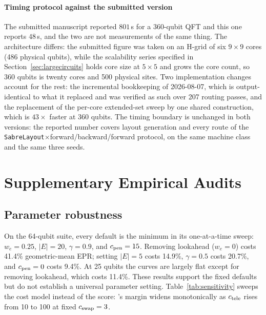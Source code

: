 \paragraph*{Timing protocol against the submitted version}
The submitted manuscript reported $801$\,s for a 360-qubit QFT and this one
reports $48$\,s, and the two are not measurements of the same thing.  The
architecture differs: the submitted figure was taken on an H-grid of six
$9{\times}9$ cores (486 physical qubits), while the scalability series
specified in Section~\ref{sec:largecircuits} holds core size at $5{\times}5$
and grows the core count, so 360 qubits is twenty cores and 500 physical
sites.  Two implementation changes account for the rest: the incremental
bookkeeping of 2026-08-07, which is output-identical to what it replaced and
was verified as such over 207 routing passes, and the replacement of the
per-core extended-set sweep by one shared construction, which is $43\times$
faster at 360 qubits.  The timing boundary is unchanged in both versions: the
reported number covers layout generation and every route of the
\texttt{SabreLayout}$\times$forward/backward/forward protocol, on the same
machine class and the same three seeds.

\section{Supplementary Empirical Audits}
\label{app:audits}

\subsection{Parameter robustness}
\label{app:sensitivity}
On the 64-qubit suite, every default is the minimum in its one-at-a-time
sweep: $w_e=0.25$, $|E|=20$, $\gamma=0.9$, and $c_{\rm pen}=15$.  Removing
lookahead ($w_e=0$) costs 41.4\% geometric-mean EPR; setting $|E|=5$ costs
14.9\%, $\gamma=0.5$ costs 20.7\%, and $c_{\rm pen}=0$ costs 9.4\%.
At 25 qubits the curves are largely flat except for removing lookahead, which
costs 11.4\%.  These results support the fixed defaults but do not establish
a universal parameter setting.  Table~\ref{tab:sensitivity} sweeps the cost
model instead of the score: \dSABRE{}'s margin widens monotonically as
$c_{\rm tele}$ rises from 10 to 100 at fixed $c_{\rm swap}=3$.

